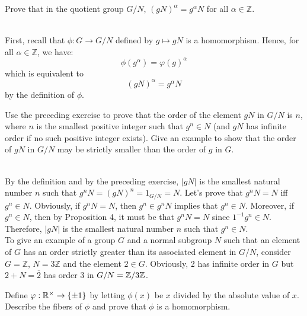 \begin{exercise}
    Prove that in the quotient group $G/N$, $(gN)^{\alpha} = g^{\alpha}N$ for all $\alpha \in \mathbb{Z}$. \\
\end{exercise}

\begin{solution}
    \\ First, recall that $\phi : G \to G/N$ defined by $g \mapsto gN$ is a homomorphism. Hence, for all $\alpha \in \mathbb{Z}$, we have:
    $$\phi(g^{\alpha}) = \varphi(g)^{\alpha}$$
    which is equivalent to
    $$(gN)^{\alpha} = g^{\alpha}N$$
    by the definition of $\phi$. \\
\end{solution}

\begin{exercise}
    Use the preceding exercise to prove that the order of the element $gN$ in $G/N$ is $n$, where $n$ is the smallest positive integer such that $g^n \in N$ (and $gN$ has infinite order if no such positive integer exists). Give an example to show that the order of $gN$ in $G/N$ may be strictly smaller than the order of $g$ in $G$. \\
\end{exercise}

\begin{solution}
    \\ By the definition and by the preceding exercise, $|gN|$ is the smallest natural number $n$ such that $g^n N = (gN)^n = 1_{G/N} = N$. Let's prove that $g^n N = N$ iff $g^n \in N$. Obviously, if $g^n N = N$, then $g^n \in g^nN$ implies that $g^n \in N$. Moreover, if $g^n \in N$, then by Proposition 4, it must be that $g^n N = N$ since $1^{-1}g^n \in N$. Therefore, $|gN|$ is the smallest natural number $n$ such that $g^n \in N$. \\
    To give an example of a group $G$ and a normal subgroup $N$ such that an element of $G$ has an order strictly greater than its associated element in $G/N$, consider $G = \mathbb{Z}$, $N = 3\mathbb{Z}$ and the element $2 \in G$. Obviously, 2 has infinite order in $G$ but $2 + N = \overline{2}$ has order 3 in $G/N = \mathbb{Z} / 3 \mathbb{Z}$. \\ 
\end{solution}

\begin{exercise}
    Define $\varphi : \mathbb{R}^{\times} \to \{\pm 1\}$ by letting $\phi(x)$ be $x$ divided by the absolute value of $x$. Describe the fibers of $\phi$ and prove that $\phi$ is a homomorphism. \\
\end{exercise}

